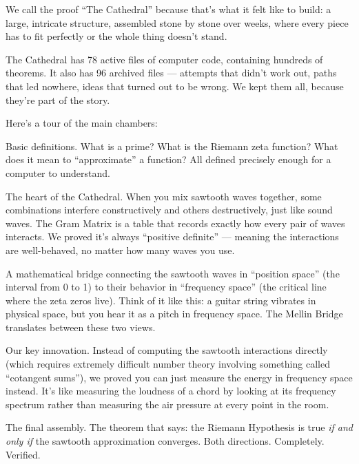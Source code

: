 \documentclass[12pt,a4paper]{article}
\begin{document}
We call the proof ``The Cathedral'' because that's what it felt like to
build: a large, intricate structure, assembled stone by stone over weeks,
where every piece has to fit perfectly or the whole thing doesn't stand.

The Cathedral has 78 active files of computer code, containing hundreds
of theorems. It also has 96 archived files --- attempts that didn't work
out, paths that led nowhere, ideas that turned out to be wrong. We
kept them all, because they're part of the story.

Here's a tour of the main chambers:

\begin{description}[leftmargin=2cm, labelwidth=1.8cm]
  \item[The Foundation] Basic definitions. What is a prime? What is the
    Riemann zeta function? What does it mean to ``approximate'' a
    function? All defined precisely enough for a computer to understand.

  \item[The Gram Matrix] The heart of the Cathedral. When you mix
    sawtooth waves together, some combinations interfere constructively
    and others destructively, just like sound waves. The Gram Matrix
    is a table that records exactly how every pair of waves interacts.
    We proved it's always ``positive definite'' --- meaning the
    interactions are well-behaved, no matter how many waves you use.

  \item[The Mellin Bridge] A mathematical bridge connecting the
    sawtooth waves in ``position space'' (the interval from 0 to 1) to
    their behavior in ``frequency space'' (the critical line where the
    zeta zeros live). Think of it like this: a guitar string vibrates
    in physical space, but you hear it as a pitch in frequency space.
    The Mellin Bridge translates between these two views.

  \item[The Parseval Bridge] Our key innovation. Instead of computing
    the sawtooth interactions directly (which requires extremely
    difficult number theory involving something called ``cotangent
    sums''), we proved you can just measure the energy in frequency
    space instead. It's like measuring the loudness of a chord by
    looking at its frequency spectrum rather than measuring the air
    pressure at every point in the room.

  \item[The Crown] The final assembly. The theorem that says: the
    Riemann Hypothesis is true \emph{if and only if} the sawtooth
    approximation converges. Both directions. Completely. Verified.
\end{description}
\end{document}
